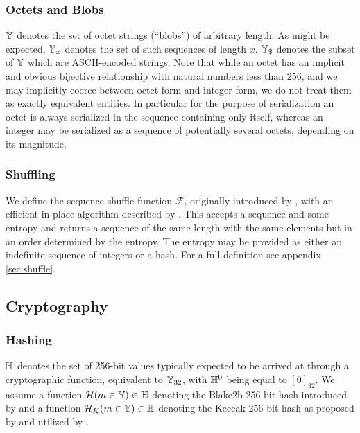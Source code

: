 \subsubsection{Octets and Blobs}

$\mathbb{Y}$ denotes the set of octet strings (``blobs'') of arbitrary length. As might be expected, $\mathbb{Y}_x$ denotes the set of such sequences of length $x$. $\Y_\$$ denotes the subset of $\mathbb{Y}$ which are ASCII-encoded strings. Note that while an octet has an implicit and obvious bijective relationship with natural numbers less than 256, and we may implicitly coerce between octet form and integer form, we do not treat them as exactly equivalent entities. In particular for the purpose of serialization an octet is always serialized in the sequence containing only itself, whereas an integer may be serialized as a sequence of potentially several octets, depending on its magnitude.

\subsubsection{Shuffling}

We define the sequence-shuffle function $\mathcal{F}$, originally introduced by \cite{fisheryates1938statistical}, with an efficient in-place algorithm described by \cite{wikipedia2024fisheryates}. This accepts a sequence and some entropy and returns a sequence of the same length with the same elements but in an order determined by the entropy. The entropy may be provided as either an indefinite sequence of integers or a hash. For a full definition see appendix \ref{sec:shuffle}.

\subsection{Cryptography}\label{sec:cryptography}

\subsubsection{Hashing}

$\mathbb{H}$ denotes the set of 256-bit values typically expected to be arrived at through a cryptographic function, equivalent to $\mathbb{Y}_{32}$, with $\mathbb{H}^0$ being equal to $[0]_{32}$. We assume a function $\mathcal{H}(m \in \mathbb{Y}) \in \mathbb{H}$ denoting the Blake2b 256-bit hash introduced by \cite{rfc7693} and a function $\mathcal{H}_K(m \in \mathbb{Y}) \in \mathbb{H}$ denoting the Keccak 256-bit hash as proposed by \cite{bertoni2013keccak} and utilized by \cite{wood2014ethereum}.

